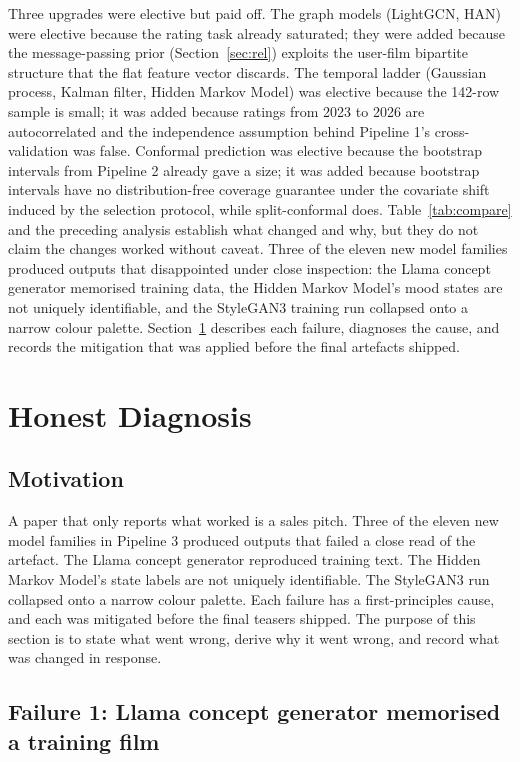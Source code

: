 \documentclass{article}
\begin{document}
Three upgrades were elective but paid off. The graph models (LightGCN, HAN) were elective because the rating task already saturated; they were added because the message-passing prior (Section~\ref{sec:rel}) exploits the user-film bipartite structure that the flat feature vector discards. The temporal ladder (Gaussian process, Kalman filter, Hidden Markov Model) was elective because the 142-row sample is small; it was added because ratings from 2023 to 2026 are autocorrelated and the independence assumption behind Pipeline 1's cross-validation was false. Conformal prediction was elective because the bootstrap intervals from Pipeline 2 already gave a size; it was added because bootstrap intervals have no distribution-free coverage guarantee under the covariate shift induced by the selection protocol, while split-conformal does. Table~\ref{tab:compare} and the preceding analysis establish what changed and why, but they do not claim the changes worked without caveat. Three of the eleven new model families produced outputs that disappointed under close inspection: the Llama concept generator memorised training data, the Hidden Markov Model's mood states are not uniquely identifiable, and the StyleGAN3 training run collapsed onto a narrow colour palette. Section~\ref{sec:diagnosis} describes each failure, diagnoses the cause, and records the mitigation that was applied before the final artefacts shipped.

\section{Honest Diagnosis}
\label{sec:diagnosis}

\subsection{Motivation}

A paper that only reports what worked is a sales pitch. Three of the eleven new model families in Pipeline 3 produced outputs that failed a close read of the artefact. The Llama concept generator reproduced training text. The Hidden Markov Model's state labels are not uniquely identifiable. The StyleGAN3 run collapsed onto a narrow colour palette. Each failure has a first-principles cause, and each was mitigated before the final teasers shipped. The purpose of this section is to state what went wrong, derive why it went wrong, and record what was changed in response.

\subsection{Failure 1: Llama concept generator memorised a training film}
\end{document}
